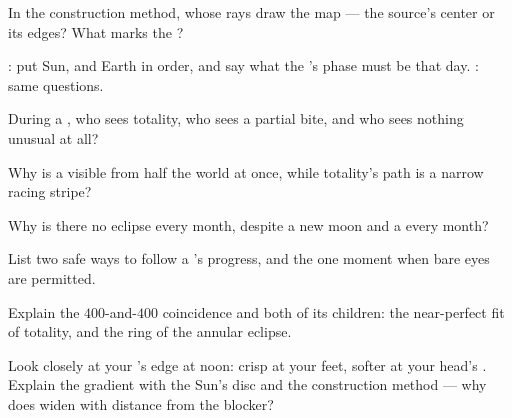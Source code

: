 \begin{exercise}[$\star$]\label{exo:g7:shadows-eclipses:3}
In the construction method, whose rays draw the  map ---
the source's center or its edges? What marks the ?
\end{exercise}

\begin{exercise}[$\star$]\label{exo:g7:shadows-eclipses:4}
: put Sun,  and Earth in order, and say what
the 's phase must be that day. : same
questions.
\end{exercise}

\begin{exercise}[$\star$]\label{exo:g7:shadows-eclipses:5}
During a , who sees totality, who sees a partial
bite, and who sees nothing unusual at all?
\end{exercise}

\begin{exercise}[$\star$]\label{exo:g7:shadows-eclipses:6}
Why is a  visible from half the world at once,
while totality's path is a narrow racing stripe?
\end{exercise}

\begin{exercise}[$\star$]\label{exo:g7:shadows-eclipses:7}
Why is there no eclipse every month, despite a new moon and a
 every month?
\end{exercise}

\begin{exercise}[$\star$]\label{exo:g7:shadows-eclipses:8}
List two safe ways to follow a 's progress, and the
one moment when bare eyes are permitted.
\end{exercise}

\begin{exercise}[$\star\star$]\label{exo:g7:shadows-eclipses:9}
Explain the $400$-and-$400$ coincidence and both of its
children: the near-perfect fit of totality, and the ring of the
annular eclipse.
\end{exercise}

\begin{exercise}[$\star\star$]\label{exo:g7:shadows-eclipses:10}
Look closely at your 's edge at noon: crisp at your feet,
softer at your head's . Explain the gradient with the
Sun's disc and the construction method --- why does 
widen with distance from the blocker?
\end{exercise}

